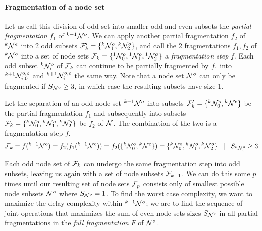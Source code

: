 \paragraph{Fragmentation of a node set}

Let us call this division of odd set into smaller odd and even subsets the \emph{partial fragmentation} $f_1$ of ${}^{k-1}\mathcal{N}^o$. We can apply another partial fragmentation $f_2$ of ${}^{k}\mathcal{N}^e$ into 2 odd subsets $\mathcal{F}'_k=\{{}^{k}\mathcal{N}^{o}_1, {}^{k}\mathcal{N}^{o}_2\}$, and call the 2 fragmentations $f_1, f_2$ of ${}^{k}\mathcal{N}^o$ into a set of node sets $\mathcal{F}_k = \{{}^{1}\mathcal{N}^o_0, {}^{1}\mathcal{N}^{o}_1, {}^{1}\mathcal{N}^{o}_2\}$ a \emph{fragmentation step} $f$. Each odd subset ${}^{k}\mathcal{N}^o_i$ of $\mathcal{F}_k$ can continue to be partially fragmented by $f_1$ into ${}^{k+1}\mathcal{N}^{o,o}_{i, 0}$ and ${}^{k+1}\mathcal{N}^{o,e}_i$ the same way. Note that a node set $\mathcal{N}^o$ can only be fragmented if $S_{\mathcal{N}^o} \geq 3$, in which case the resulting subsets have size 1.

\begin{lemma}\label{lem:partialfrag}
  Let the separation of an odd node set ${}^{k-1}\mathcal{N}^o$ into subsets $\mathcal{F}_k'=\{{}^{k}\mathcal{N}^o_0, {}^{k}\mathcal{N}^e\}$ be the partial fragmentation $f_1$ and subsequently into subsets $\mathcal{F}_k= \{{}^{k}\mathcal{N}^o_0, {}^{k}\mathcal{N}^{o}_1, {}^{k}\mathcal{N}^{o}_2\}$ be $f_2$ of $\mathcal{N}$. The combination of the two is a fragmentation step $f$.
  \begin{equation}\label{eq:partialfrag}
    \mathcal{F}_k = f({}^{k-1}\mathcal{N}^o) = f_2(f_1({}^{k-1}\mathcal{N}^o)) = f_2(\{{}^{k}\mathcal{N}^o_0, {}^{k}\mathcal{N}^e\}) = \{{}^{k}\mathcal{N}^o_0, {}^{k}\mathcal{N}^{o}_1, {}^{k}\mathcal{N}^{o}_2\} \hspace{.3cm} | \hspace{.3cm} S_{{}^{k}\mathcal{N}^o_i} \geq 3
  \end{equation}
\end{lemma}

Each odd node set of $\mathcal{F}_k$ can undergo the same fragmentation step into odd subsets, leaving us again with a set of node subsets $\mathcal{F}_{k+1}$. We can do this some $p$ times until our resulting set of node sets $\mathcal{F}_{p}$ consists only of smallest possible node subsets $\mathcal{N}^o$ where $S_{\mathcal{N}^o}=1$. To find the worst case complexity, we want to maximize the delay complexity within ${}^{k-1}\mathcal{N}^o$; we are to find the sequence of joint operations that maximizes the sum of even node sets sizes $S_{\mathcal{N}^e}$ in all partial fragmentations in the \emph{full fragmentation} $F$ of $\mathcal{N}^o$.

